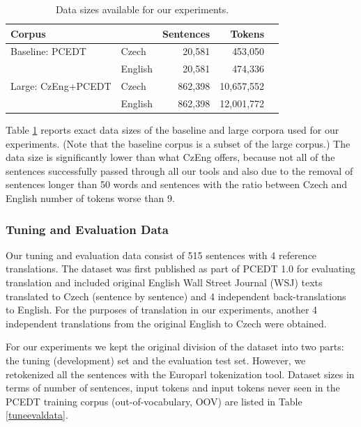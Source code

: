 \documentclass[11pt]{report}
\theoremstyle{plain}
\begin{document}
{{\begin{table}[t]
\begin{center}
\begin{tabular}{llrrr}
Corpus  &    &  Sentences  &  Tokens\\
\hline
Baseline: PCEDT  &  Czech    &  20,581   &  453,050\\
                 &  English  &  20,581   &  474,336\\
\hline
Large: CzEng+PCEDT     &  Czech    &  862,398  &  10,657,552\\
                 &  English  &  862,398  &  12,001,772\\
\end{tabular}
\end{center}
\caption{Data sizes available for our experiments.}
\label{corpsizes}
\end{table}

Table \ref{corpsizes} reports exact data sizes of the baseline and large
corpora used for our experiments. (Note that the baseline corpus is a subset of
the large corpus.) The data size is significantly lower than what CzEng offers,
because not all of the sentences successfully passed through all our tools and
also due to the removal of sentences longer than 50 words and sentences with the ratio
between Czech and English number of tokens worse than 9.






\subsubsection{Tuning and Evaluation Data}
\label{references}


Our tuning and evaluation data consist of 515 sentences
with 4 reference
translations. The dataset was first published as part of PCEDT 1.0 for
evaluating \toen{} translation and included original English Wall Street
Journal (WSJ) texts translated to Czech (sentence by sentence) and 4 independent
back-translations to English. For the purposes of \tocs{} translation in our experiments, another 4
independent translations from the original English to Czech were obtained.

For our experiments we kept the original division of the dataset into two parts: the
tuning (development) set and the evaluation test set.
However, we retokenized all the sentences with the Europarl
tokenization tool. Dataset sizes in terms of number of sentences, input tokens
and input tokens never seen in the PCEDT training corpus (out-of-vocabulary,
OOV) are listed in Table \ref{tuneevaldata}.

}}
\end{document}

